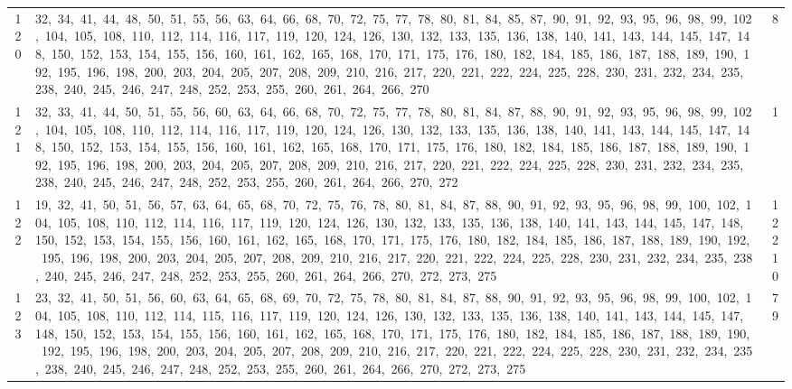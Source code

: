 \begin{longtable}{c|p{}|r}
120 & 32,\ 34,\ 41,\ 44,\ 48,\ 50,\ 51,\ 55,\ 56,\ 63,\ 64,\ 66,\ 68,\ 70,\ 72,\ 75,\ 77,\ 78,\ 80,\ 81,\ 84,\ 85,\ 87,\ 90,\ 91,\ 92,\ 93,\ 95,\ 96,\ 98,\ 99,\ 102,\ 104,\ 105,\ 108,\ 110,\ 112,\ 114,\ 116,\ 117,\ 119,\ 120,\ 124,\ 126,\ 130,\ 132,\ 133,\ 135,\ 136,\ 138,\ 140,\ 141,\ 143,\ 144,\ 145,\ 147,\ 148,\ 150,\ 152,\ 153,\ 154,\ 155,\ 156,\ 160,\ 161,\ 162,\ 165,\ 168,\ 170,\ 171,\ 175,\ 176,\ 180,\ 182,\ 184,\ 185,\ 186,\ 187,\ 188,\ 189,\ 190,\ 192,\ 195,\ 196,\ 198,\ 200,\ 203,\ 204,\ 205,\ 207,\ 208,\ 209,\ 210,\ 216,\ 217,\ 220,\ 221,\ 222,\ 224,\ 225,\ 228,\ 230,\ 231,\ 232,\ 234,\ 235,\ 238,\ 240,\ 245,\ 246,\ 247,\ 248,\ 252,\ 253,\ 255,\ 260,\ 261,\ 264,\ 266,\ 270 & 8 \\
121 & 32,\ 33,\ 41,\ 44,\ 50,\ 51,\ 55,\ 56,\ 60,\ 63,\ 64,\ 66,\ 68,\ 70,\ 72,\ 75,\ 77,\ 78,\ 80,\ 81,\ 84,\ 87,\ 88,\ 90,\ 91,\ 92,\ 93,\ 95,\ 96,\ 98,\ 99,\ 102,\ 104,\ 105,\ 108,\ 110,\ 112,\ 114,\ 116,\ 117,\ 119,\ 120,\ 124,\ 126,\ 130,\ 132,\ 133,\ 135,\ 136,\ 138,\ 140,\ 141,\ 143,\ 144,\ 145,\ 147,\ 148,\ 150,\ 152,\ 153,\ 154,\ 155,\ 156,\ 160,\ 161,\ 162,\ 165,\ 168,\ 170,\ 171,\ 175,\ 176,\ 180,\ 182,\ 184,\ 185,\ 186,\ 187,\ 188,\ 189,\ 190,\ 192,\ 195,\ 196,\ 198,\ 200,\ 203,\ 204,\ 205,\ 207,\ 208,\ 209,\ 210,\ 216,\ 217,\ 220,\ 221,\ 222,\ 224,\ 225,\ 228,\ 230,\ 231,\ 232,\ 234,\ 235,\ 238,\ 240,\ 245,\ 246,\ 247,\ 248,\ 252,\ 253,\ 255,\ 260,\ 261,\ 264,\ 266,\ 270,\ 272 & 1 \\
122 & 19,\ 32,\ 41,\ 50,\ 51,\ 56,\ 57,\ 63,\ 64,\ 65,\ 68,\ 70,\ 72,\ 75,\ 76,\ 78,\ 80,\ 81,\ 84,\ 87,\ 88,\ 90,\ 91,\ 92,\ 93,\ 95,\ 96,\ 98,\ 99,\ 100,\ 102,\ 104,\ 105,\ 108,\ 110,\ 112,\ 114,\ 116,\ 117,\ 119,\ 120,\ 124,\ 126,\ 130,\ 132,\ 133,\ 135,\ 136,\ 138,\ 140,\ 141,\ 143,\ 144,\ 145,\ 147,\ 148,\ 150,\ 152,\ 153,\ 154,\ 155,\ 156,\ 160,\ 161,\ 162,\ 165,\ 168,\ 170,\ 171,\ 175,\ 176,\ 180,\ 182,\ 184,\ 185,\ 186,\ 187,\ 188,\ 189,\ 190,\ 192,\ 195,\ 196,\ 198,\ 200,\ 203,\ 204,\ 205,\ 207,\ 208,\ 209,\ 210,\ 216,\ 217,\ 220,\ 221,\ 222,\ 224,\ 225,\ 228,\ 230,\ 231,\ 232,\ 234,\ 235,\ 238,\ 240,\ 245,\ 246,\ 247,\ 248,\ 252,\ 253,\ 255,\ 260,\ 261,\ 264,\ 266,\ 270,\ 272,\ 273,\ 275 & 12210 \\
123 & 23,\ 32,\ 41,\ 50,\ 51,\ 56,\ 60,\ 63,\ 64,\ 65,\ 68,\ 69,\ 70,\ 72,\ 75,\ 78,\ 80,\ 81,\ 84,\ 87,\ 88,\ 90,\ 91,\ 92,\ 93,\ 95,\ 96,\ 98,\ 99,\ 100,\ 102,\ 104,\ 105,\ 108,\ 110,\ 112,\ 114,\ 115,\ 116,\ 117,\ 119,\ 120,\ 124,\ 126,\ 130,\ 132,\ 133,\ 135,\ 136,\ 138,\ 140,\ 141,\ 143,\ 144,\ 145,\ 147,\ 148,\ 150,\ 152,\ 153,\ 154,\ 155,\ 156,\ 160,\ 161,\ 162,\ 165,\ 168,\ 170,\ 171,\ 175,\ 176,\ 180,\ 182,\ 184,\ 185,\ 186,\ 187,\ 188,\ 189,\ 190,\ 192,\ 195,\ 196,\ 198,\ 200,\ 203,\ 204,\ 205,\ 207,\ 208,\ 209,\ 210,\ 216,\ 217,\ 220,\ 221,\ 222,\ 224,\ 225,\ 228,\ 230,\ 231,\ 232,\ 234,\ 235,\ 238,\ 240,\ 245,\ 246,\ 247,\ 248,\ 252,\ 253,\ 255,\ 260,\ 261,\ 264,\ 266,\ 270,\ 272,\ 273,\ 275 & 79 \\

\end{longtable}

